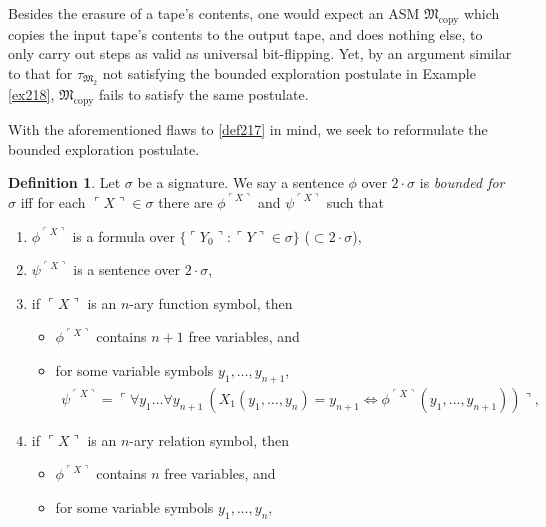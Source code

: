 \documentclass[12pt, twoside]{memoir}
\numberwithin{equation}{section}
\theoremstyle{definition}
\newtheorem{defi}[thm]{Definition}
\theoremstyle{remark}
\theoremstyle{definition}
\theoremstyle{definition}
\theoremstyle{definition}
\theoremstyle{remark}
\begin{document}
Besides the erasure of a tape's contents, one would expect an ASM $\mathfrak{M}_{\text{copy}}$ which copies the input tape's contents to the output tape, and does nothing else, to only carry out steps as valid as universal bit-flipping. Yet, by an argument similar to that for $\tau_{\mathfrak{M}_2}$ not satisfying the bounded exploration postulate in Example \ref{ex218}, $\mathfrak{M}_{\text{copy}}$ fails to satisfy the same postulate. 

With the aforementioned flaws to \ref{def217} in mind, we seek to reformulate the bounded exploration postulate.

\begin{defi}\label{def220}
Let $\sigma$ be a signature. We say a sentence $\phi$ over $2 \cdot \sigma$ is \emph{bounded for} $\sigma$ iff for each $\ulcorner X \urcorner \in \sigma$ there are $\phi^{\ulcorner X \urcorner}$ and $\psi^{\ulcorner X \urcorner}$ such that
\begin{enumerate}[label=(\alph*)]
    \item $\phi^{\ulcorner X \urcorner}$ is a formula over $\{\ulcorner Y_0 \urcorner : \ulcorner Y \urcorner \in \sigma\}$ ($\subset 2 \cdot \sigma$),
    \item $\psi^{\ulcorner X \urcorner}$ is a sentence over $2 \cdot \sigma$,
    \item if $\ulcorner X \urcorner$ is an $n$-ary function symbol, then 
    \begin{itemize}[label=$\circ$, leftmargin=20pt]
        \item $\phi^{\ulcorner X \urcorner}$ contains $n + 1$ free variables, and
        \item for some variable symbols $y_1, \dots, y_{n+1}$,
        \begin{align*}
            \psi^{\ulcorner X \urcorner} = \ulcorner \forall y_1 \dots \forall y_{n+1} \ (X_1(y_1, \dots, y_n) = y_{n+1} \iff \phi^{\ulcorner X \urcorner}(y_1, \dots, y_{n+1})) \urcorner \text{,}
        \end{align*}
    \end{itemize}
    \item if $\ulcorner X \urcorner$ is an $n$-ary relation symbol, then 
    \begin{itemize}[label=$\circ$, leftmargin=20pt]
        \item $\phi^{\ulcorner X \urcorner}$ contains $n$ free variables, and
        \item for some variable symbols $y_1, \dots, y_n$,
        \begin{align*}

\end{align*}
\end{itemize}
\end{enumerate}
\end{defi}
\end{document}
